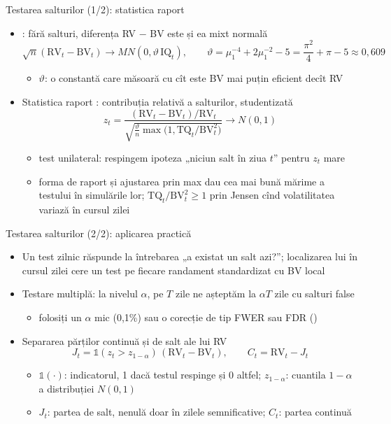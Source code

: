 \begin{frame}{Testarea salturilor (1/2): statistica raport}
\itemsize{\small}
\begin{itemize}
    \item {}: fără salturi, diferența RV $-$ BV este și ea mixt normală
    \[ \sqrt n(\mathrm{RV}_t - \mathrm{BV}_t) \to MN(0, \vartheta\,\mathrm{IQ}_t), \qquad \vartheta = \mu_1^{-4} + 2\mu_1^{-2} - 5 = \frac{\pi^2}{4} + \pi - 5 \approx 0{,}609 \]
    \begin{itemize}
        \item $\vartheta$: o constantă care măsoară cu cît este BV mai puțin eficient decît RV
    \end{itemize}
    \item Statistica raport : contribuția relativă a salturilor, studentizată
    \[ z_t = \frac{(\mathrm{RV}_t - \mathrm{BV}_t)/\mathrm{RV}_t}{\sqrt{\frac{\vartheta}{n}\max\big(1, \mathrm{TQ}_t/\mathrm{BV}_t^2\big)}} \to N(0, 1) \]
    \begin{itemize}
        \item test unilateral: respingem ipoteza „niciun salt în ziua $t$” pentru $z_t$ mare
        \item forma de raport și ajustarea prin max dau cea mai bună mărime a testului în simulările lor; $\mathrm{TQ}_t/\mathrm{BV}_t^2 \ge 1$ prin Jensen cînd volatilitatea variază în cursul zilei
    \end{itemize}
\end{itemize}
\end{frame}

\begin{frame}{Testarea salturilor (2/2): aplicarea practică}
\itemsize{\small}
\begin{itemize}
    \item Un test zilnic răspunde la întrebarea „a existat un salt azi?”; localizarea lui în cursul zilei cere un test pe fiecare randament standardizat cu BV local 
    \item Testare multiplă: la nivelul $\alpha$, pe $T$ zile ne așteptăm la $\alpha T$ zile cu salturi false
    \begin{itemize}
        \item folosiți un $\alpha$ mic (0,1\%) sau o corecție de tip FWER sau FDR ()
    \end{itemize}
    \item Separarea părților continuă și de salt ale lui RV 
    \[ J_t = \mathbb 1(z_t > z_{1-\alpha})\,(\mathrm{RV}_t - \mathrm{BV}_t), \qquad C_t = \mathrm{RV}_t - J_t \]
    \begin{itemize}
        \item $\mathbb 1(\cdot)$: indicatorul, 1 dacă testul respinge și 0 altfel; $z_{1-\alpha}$: cuantila $1-\alpha$ a distribuției $N(0, 1)$
        \item $J_t$: partea de salt, nenulă doar în zilele semnificative; $C_t$: partea continuă
    \end{itemize}
\end{itemize}
\end{frame}

